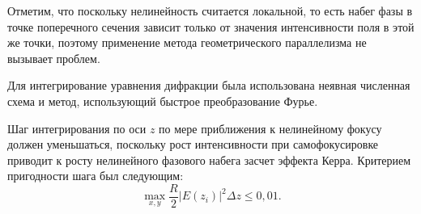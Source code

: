 Отметим, что поскольку нелинейность считается локальной, то есть набег фазы в точке поперечного сечения зависит только от значения интенсивности поля в этой же точки, поэтому применение метода геометрического параллелизма не вызывает проблем.

Для интегрирование уравнения дифракции была использована неявная численная схема и метод, использующий быстрое преобразование Фурье.

Шаг интегрирования по оси $z$ по мере приближения к нелинейному фокусу должен уменьшаться, поскольку рост интенсивности при самофокусировке приводит к росту нелинейного фазового набега засчет эффекта Керра.
Критерием пригодности шага был следующим:
\begin{equation}\label{StepCriterium}
    \max\limits_{x,y}\dfrac{R}{2}\left|E(z_i)\right|^2\Delta z \leqslant 0{,}01.
\end{equation}

